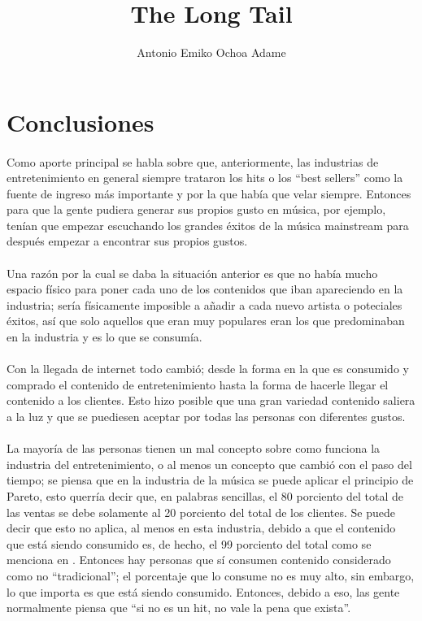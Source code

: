 \documentclass{article}
\begin{document}
\title{The Long Tail}
\author{Antonio Emiko Ochoa Adame}
\maketitle

\section{Conclusiones}

\paragraph{}
Como aporte principal se habla sobre que, anteriormente, las industrias de
entretenimiento en general siempre trataron los hits o los ``best sellers''
como la fuente de ingreso más importante y por la que había que velar siempre.
Entonces para que la gente pudiera generar sus propios gusto en música, por
ejemplo, tenían que empezar escuchando los grandes éxitos de la música mainstream
para después empezar a encontrar sus propios gustos.

\paragraph{}
Una razón por la cual se daba la situación anterior es que no había mucho espacio
físico para poner cada uno de los contenidos que iban apareciendo en la industria;
sería físicamente imposible a añadir a cada nuevo artista o poteciales
éxitos, así que solo aquellos que eran muy populares eran los que predominaban
en la industria y es lo que se consumía.

\paragraph{}
Con la llegada de internet todo cambió; desde la forma en la que es consumido
y comprado el contenido de entretenimiento hasta la forma de hacerle llegar el
contenido a los clientes. Esto hizo posible que una gran variedad contenido
saliera a la luz y que se puediesen aceptar por todas las personas con
diferentes gustos.

\paragraph{}
La mayoría de las personas tienen un mal concepto sobre como funciona la industria
del entretenimiento, o al menos un concepto que cambió con el paso del tiempo;
se piensa que en la industria de la música se puede aplicar el principio de Pareto,
esto querría decir que, en palabras sencillas, el 80 porciento del total de las
ventas se debe solamente al 20 porciento del total de los clientes.
Se puede decir que esto no aplica, al menos en esta industria, debido a que el
contenido que está siendo consumido es, de hecho, el 99 porciento del total como
se menciona en \cite{tlt}. Entonces hay personas que sí consumen contenido
considerado como no ``tradicional''; el porcentaje que lo consume no es muy alto,
sin embargo, lo que importa es que está siendo consumido.
Entonces, debido a eso, las gente normalmente piensa que ``si no es un hit,
no vale la pena que exista''.
\end{document}
